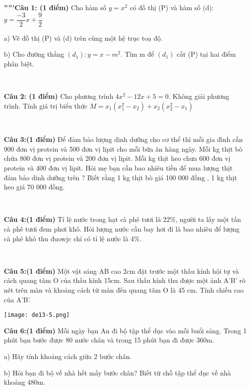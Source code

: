 \documentclass[12pt]{article}
\begin{document}
\textbf{'''''Câu 1: (1 điểm)} Cho hàm số $y = x^2$ có đồ thị (P) và hàm số (d): $y = \dfrac{-3}{2}x + \dfrac{9}{2}$ \par
a) Vẽ đồ thị (P) và (d) trên cùng một hệ trục toạ độ. \par
b) Cho đường thẳng $(d_1) : y = x - m^2$. Tìm m để $(d_1)$ cắt (P) tại hai điểm phân biệt.

\   

\textbf{Câu 2: (1 điểm)} Cho phương trình $4x^2 - 12x + 5 = 0$. Không giải phương trình. Tính giá trị biểu thức $M = x_1(x_1^2 - x_2) + x_2(x_2^2 - x_1)$ \par

\    

\textbf{Câu 3:(1 điểm)} Để đảm bảo lượng dinh dưỡng cho cơ thể thì mỗi gia đình cần 900 đơn vị protein và 500 đơn vị lipit cho mỗi bữa ăn hàng ngày. Mỗi kg thịt bò chứa 800 đơn vị protein và 200 đơn vị lipit. Mỗi kg thịt heo chưa 600 đơn vị protein và 400 đơn vị lipit. Hỏi mẹ bạn cần bao nhiêu tiền để mua lượng thịt đảm bảo dinh dưỡng trên ? Biết rằng 1 kg thịt bò giá 100 000 đồng , 1 kg thịt heo giá 70 000 đồng. \par

\   

\textbf{Câu 4:(1 điểm)} Tỉ lệ nước trong hạt cà phê tươi là 22\%, người ta lấy một tấn cà phê tươi đem phơi khô. Hỏi lượng nước cần bay hơi đi là bao nhiêu để lượng cà phê khô thu đuowjc chỉ có tỉ lệ nước là 4\%. \par

\   

\begin{multicols}{2}

\textbf{Câu 5:(1 điểm)} Một vật sáng AB cao 2cm đặt trước một thấu kính hội tự và cách quang tâm O của thấu kính 15cm. Sau thấu kính thu được một ảnh A'B' rõ nét trên màn và khoảng cách từ màn đến quang tâm O là 45 cm. Tính chiều cao của A'B'. \par

\columnbreak

\begin{center}
    \texttt{[image: de13-5.png]}
\end{center}

\end{multicols}

\textbf{Câu 6:(1 điểm)} Mỗi ngày bạn An đi bộ tập thể dục vào mỗi buổi sáng. Trong 1 phút bạn bước được 80 nước chân và trong 15 phút bạn đi được 360m. \par
a) Hãy tính khoảng cách giữa 2 bước chân. \par
b) Hỏi bạn đi bộ về nhà hết mấy bước chân? Biết từ chỗ tập thể dục về nhà khoảng 480m.\par
\end{document}
